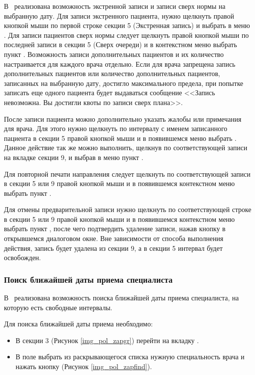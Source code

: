 В \tmis~реализована возможность экстренной записи и записи сверх нормы на выбранную дату. Для записи экстренного пациента, нужно щелкнуть правой кнопкой мыши по первой строке секции 5 (Экстренная запись) и выбрать в меню . Для записи пациентов сверх нормы следует щелкнуть правой кнопкой мыши по последней записи в секции 5 (Сверх очереди) и в контекстном меню выбрать пункт . Возможность записи дополнительных пациентов и их количество настраивается для каждого врача отдельно. Если для врача запрещена запись дополнительных пациентов или количество дополнительных пациентов, записанных на выбранную дату, достигло максимального предела, при попытке записать еще одного пациента будет выдаваться сообщение <<Запись невозможна. Вы достигли квоты по записи сверх плана>>.

После записи пациента можно дополнительно указать жалобы или примечания для врача. Для этого нужно щелкнуть по интервалу с именем записанного пациента в секции 5 правой кнопкой мыши и в появившемся меню выбрать . Данное действие так же можно выполнить, щелкнув по соответствующей записи на вкладке  секции 9, и выбрав в меню пункт .

Для повторной печати направления следует щелкнуть по соответствующей записи в секции 5 или 9 правой кнопкой мыши и в появившемся контекстном меню выбрать пункт .

Для отмены предварительной записи нужно щелкнуть по соответствующей строке в секции 5 или 9 правой кнопкой мыши и в появившемся контекстном меню выбрать пункт , после чего подтвердить удаление записи, нажав кнопку   в открывшемся диалоговом окне. Вне зависимости от способа выполнения действия, запись будет удалена из секции 9, а в секции 5 интервал будет освобожден.

\subsubsection{Поиск ближайшей даты приема специалиста}

В \tmis~реализована возможность поиска ближайшей даты приема специалиста, на которую есть свободные интервалы. 

Для поиска ближайшей даты приема необходимо:
\begin{itemize}
 \item В секции 3 (Рисунок \ref{img_pol_zapgr}) перейти на вкладку .
 \item В поле  выбрать из раскрывающегося списка нужную специальность врача и нажать кнопку  (Рисунок \ref{img_pol_zapfind}).
\end{itemize}

